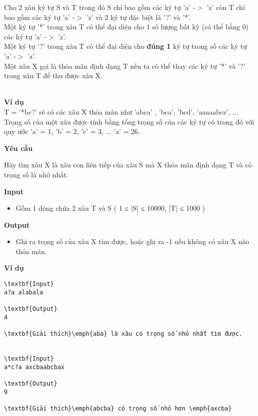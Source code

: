 

Cho 2 xâu ký tự S và T trong đó S chỉ bao gồm các ký tự 'a' -$>$ 'z' còn T chỉ bao gồm các ký tự 'a' -$>$ 'z' và 2 ký tự đặc biệt là '?' và '*'.
\\Một ký tự '*' trong xâu T có thể đại diện cho 1 số lượng bất kỳ (có thể bằng 0) các ký tự 'a' -$>$ 'z'.
\\Một ký tự '?' trong xâu T có thể đại diện cho \textbf{ đúng 1 } ký tự trong số các ký tự 'a' -$>$ 'z'.
\\Một xâu X gọi là thỏa mãn định dạng T nếu ta có thể thay các ký tự '*' và '?' trong xâu T để thu được xâu X.


\\\textbf{Ví dụ}
\\T = '*bc?' sẽ có các xâu X thỏa mãn như 'abca' , 'bca', 'bcd', 'aaaaabcz', ...
\\Trọng số của một xâu được tính bằng tổng trọng số của các ký tự có trong đó với quy ước 'a' = 1, 'b' = 2, 'c' = 3, ... 'z' = 26.

\textbf{Yêu cầu}

Hãy tìm xâu X là xâu con liên tiếp của xâu S mà X thỏa mãn định dạng T và có trọng số là nhỏ nhất.

\textbf{Input }
\begin{itemize}
	\item 

Gồm 1 dòng chứa 2 xâu T và S ( 1 ≤ |S| ≤ 10000, |T| ≤ 1000 )
\end{itemize}

\textbf{Output }
\begin{itemize}
	\item 

Ghi ra trọng số của xâu X tìm được, hoặc ghi ra -1 nếu không có xâu X nào thỏa mãn.
\end{itemize}

\textbf{Ví dụ}
\begin{verbatim}
\textbf{Input}
a?a alabala

\textbf{Output}
4

\textbf{Giải thích}\emph{aba} là xâu có trọng số nhỏ nhất tìm được.


\textbf{Input}
a*c?a axcbaabcbax

\textbf{Output}
9

\textbf{Giải thích}\emph{abcba} có trọng số nhỏ hơn \emph{axcba}\end{verbatim}